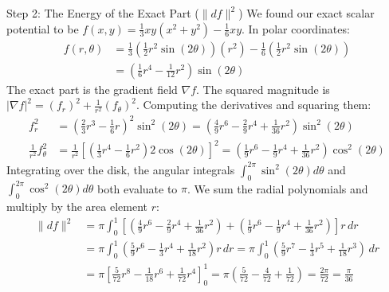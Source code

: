 \documentclass[11pt]{article}
\begin{document}
\begin{stepbox}{Step 2: The Energy of the Exact Part ($\|df\|^2$)}
We found our exact scalar potential to be $f(x,y) = \frac{1}{3}xy(x^2+y^2) - \frac{1}{6}xy$. In polar coordinates:
\begin{align*}
f(r,\theta) &= \frac{1}{3}\left(\frac{1}{2}r^2\sin(2\theta)\right)(r^2) - \frac{1}{6}\left(\frac{1}{2}r^2\sin(2\theta)\right) \\
&= \left( \frac{1}{6}r^4 - \frac{1}{12}r^2 \right) \sin(2\theta)
\end{align*}
The exact part is the gradient field $\nabla f$. The squared magnitude is $|\nabla f|^2 = (f_r)^2 + \frac{1}{r^2}(f_\theta)^2$. Computing the derivatives and squaring them:
\begin{align*}
f_r^2 &= \left(\frac{2}{3}r^3 - \frac{1}{6}r\right)^2\sin^2(2\theta) = \left(\frac{4}{9}r^6 - \frac{2}{9}r^4 + \frac{1}{36}r^2\right)\sin^2(2\theta) \\
\frac{1}{r^2}f_\theta^2 &= \frac{1}{r^2}\left[ \left(\frac{1}{3}r^4 - \frac{1}{6}r^2\right) 2\cos(2\theta) \right]^2 = \left(\frac{1}{9}r^6 - \frac{1}{9}r^4 + \frac{1}{36}r^2\right)\cos^2(2\theta)
\end{align*}
Integrating over the disk, the angular integrals $\int_0^{2\pi}\sin^2(2\theta)d\theta$ and $\int_0^{2\pi}\cos^2(2\theta)d\theta$ both evaluate to $\pi$. We sum the radial polynomials and multiply by the area element $r$:
\begin{align*}
\|df\|^2 &= \pi \int_0^1 \left[ \left(\frac{4}{9}r^6 - \frac{2}{9}r^4 + \frac{1}{36}r^2\right) + \left(\frac{1}{9}r^6 - \frac{1}{9}r^4 + \frac{1}{36}r^2\right) \right] r \, dr \\
&= \pi \int_0^1 \left( \frac{5}{9}r^6 - \frac{1}{3}r^4 + \frac{1}{18}r^2 \right) r \, dr = \pi \int_0^1 \left( \frac{5}{9}r^7 - \frac{1}{3}r^5 + \frac{1}{18}r^3 \right) \, dr \\
&= \pi \left[ \frac{5}{72}r^8 - \frac{1}{18}r^6 + \frac{1}{72}r^4 \right]_0^1 = \pi \left( \frac{5}{72} - \frac{4}{72} + \frac{1}{72} \right) = \frac{2\pi}{72} = \frac{\pi}{36}
\end{align*}
\end{stepbox}
\end{document}
